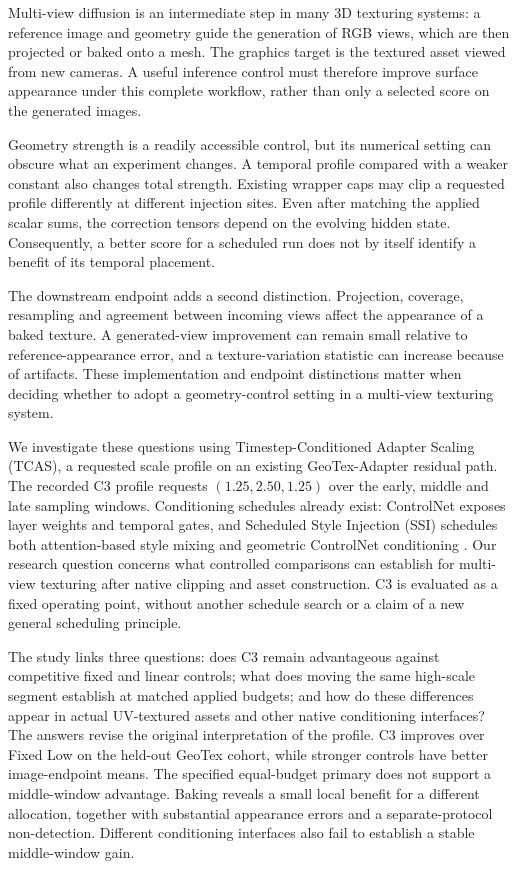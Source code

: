 \documentclass[times,twocolumn,final]{elsarticle}
\begin{document}
Multi-view diffusion is an intermediate step in many 3D texturing systems: a reference image and geometry guide the generation of RGB views, which are then projected or baked onto a mesh. The graphics target is the textured asset viewed from new cameras. A useful inference control must therefore improve surface appearance under this complete workflow, rather than only a selected score on the generated images.

Geometry strength is a readily accessible control, but its numerical setting can obscure what an experiment changes. A temporal profile compared with a weaker constant also changes total strength. Existing wrapper caps may clip a requested profile differently at different injection sites. Even after matching the applied scalar sums, the correction tensors depend on the evolving hidden state. Consequently, a better score for a scheduled run does not by itself identify a benefit of its temporal placement.

The downstream endpoint adds a second distinction. Projection, coverage, resampling and agreement between incoming views affect the appearance of a baked texture. A generated-view improvement can remain small relative to reference-appearance error, and a texture-variation statistic can increase because of artifacts. These implementation and endpoint distinctions matter when deciding whether to adopt a geometry-control setting in a multi-view texturing system.

We investigate these questions using Timestep-Conditioned Adapter Scaling (TCAS), a requested scale profile on an existing GeoTex-Adapter residual path. The recorded C3 profile requests $(1.25,2.50,1.25)$ over the early, middle and late sampling windows. Conditioning schedules already exist: ControlNet exposes layer weights and temporal gates, and Scheduled Style Injection (SSI) schedules both attention-based style mixing and geometric ControlNet conditioning \cite{controlnet2023layercontrol,diffusers2023controlnet,kulkarni2026ssi}. Our research question concerns what controlled comparisons can establish for multi-view texturing after native clipping and asset construction. C3 is evaluated as a fixed operating point, without another schedule search or a claim of a new general scheduling principle.

The study links three questions: does C3 remain advantageous against competitive fixed and linear controls; what does moving the same high-scale segment establish at matched applied budgets; and how do these differences appear in actual UV-textured assets and other native conditioning interfaces? The answers revise the original interpretation of the profile. C3 improves over Fixed Low on the held-out GeoTex cohort, while stronger controls have better image-endpoint means. The specified equal-budget primary does not support a middle-window advantage. Baking reveals a small local benefit for a different allocation, together with substantial appearance errors and a separate-protocol non-detection. Different conditioning interfaces also fail to establish a stable middle-window gain.
\end{document}
